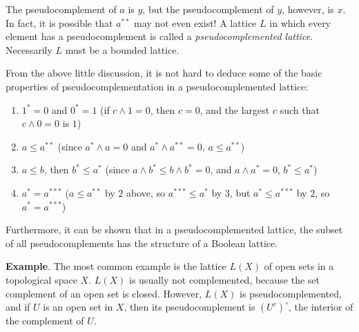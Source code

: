 \documentclass[12pt]{article}
\begin{document}
The pseudocomplement of $a$ is $y$, but the pseudocomplement of $y$, however, is $x$.  In fact, it is possible that $a^{**}$ may not even exist!  A lattice $L$ in which every element has a pseudocomplement is called a \emph{pseudocomplemented lattice}.  Necessarily $L$ must be a bounded lattice.

From the above little discussion, it is not hard to deduce some of the basic properties of pseudocomplementation in a pseudocomplemented lattice:

\begin{enumerate}
\item $1^*=0$ and $0^*=1$ (if $c\wedge 1=0$, then $c=0$, and the largest $c$ such that $c\wedge 0=0$ is $1$)
\item $a\le a^{**}$ (since $a^*\wedge a=0$ and $a^*\wedge a^{**}=0$, $a\le a^{**}$)
\item $a\le b$, then $b^*\le a^*$ (since $a\wedge b^* \le b\wedge b^*=0$, and $a\wedge a^*=0$, $b^*\le a^*$)
\item $a^*=a^{***}$ ($a\le a^{**}$ by $2$ above, so $a^{***}\le a^*$ by $3$, but $a^*\le a^{***}$ by $2$, so $a^*=a^{***}$)
\end{enumerate}

Furthermore, it can be shown that in a pseudocomplemented lattice, the subset of all pseudocomplements has the structure of a Boolean lattice.

\textbf{Example}.  The most common example is the lattice $L(X)$ of open sets in a topological space $X$.  $L(X)$ is usually not complemented, because the set complement of an open set is closed.  However, $L(X)$ is pseudocomplemented, and if $U$ is an open set in $X$, then its pseudocomplement is $(U^c)^{\circ}$, the interior of the complement of $U$.
\end{document}
